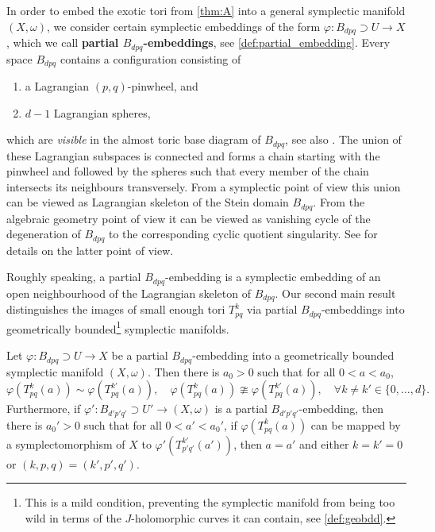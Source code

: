 \documentclass[12pt,a4paper,abstract=true,draft]{scrartcl}
\begin{document}
In order to embed the exotic tori from \cref{thm:A} into a general symplectic manifold $(X,\omega)$, we consider certain symplectic embeddings of the form $\varphi \colon B_{dpq} \supset U \rightarrow X$, which we call \textbf{partial $B_{dpq}$-embeddings}, see \cref{def:partial_embedding}. Every space $B_{dpq}$ contains a configuration consisting of 
\begin{enumerate}
    \item a Lagrangian $(p,q)$-pinwheel, and
    \item $d-1$ Lagrangian spheres,
\end{enumerate}
which are \emph{visible} in the almost toric base diagram of $B_{dpq}$, see also \cite[Chapter 5]{evans2021atfs}.
The union of these Lagrangian subspaces is connected and forms a chain starting with the pinwheel and followed by the spheres such that every member of the chain intersects its neighbours transversely.
From a symplectic point of view this union can be viewed as Lagrangian skeleton of the Stein domain $B_{dpq}$.
From the algebraic geometry point of view it can be viewed as vanishing cycle of the degeneration of $B_{dpq}$ to the corresponding cyclic quotient singularity.
See \cite{Eva19} for details on the latter point of view.

Roughly speaking, a partial $B_{dpq}$-embedding is a symplectic embedding of an open neighbourhood of the Lagrangian skeleton of $B_{dpq}$.
Our second main result distinguishes the images of small enough tori $T^k_{pq}$ via partial $B_{dpq}$-embeddings into geometrically bounded\footnote{This is a mild condition, preventing the symplectic manifold from being too wild in terms of the $J$-holomorphic curves it can contain, see \cref{def:geobdd}.} symplectic manifolds. 

\begin{maintheorem}
    \label{thm:B}
    Let $\varphi \colon B_{dpq} \supset U \rightarrow X$ be a partial $B_{dpq}$-embedding into a geometrically bounded symplectic manifold $(X,\omega)$.
Then there is $a_0 > 0$ such that for all $0 < a < a_0$, 
    \begin{equation}
        \varphi(T^k_{pq}(a)) \sim \varphi(T^{k'}_{pq}(a)), \quad 
        \varphi(T^k_{pq}(a)) \ncong \varphi(T^{k'}_{pq}(a)), \quad
        \forall k \neq k' \in \{0,\ldots,d\}.
    \end{equation}
    Furthermore, if $\varphi' \colon B_{d'p'q'} \supset U' \rightarrow (X,\omega)$ is a partial $B_{d'p'q'}$-embedding, then there is $a_0' > 0$ such that for all $0<a' < a_0'$, if $\varphi(T^k_{pq}(a))$ can be mapped by a symplectomorphism of $X$ to $\varphi'(T^{k'}_{p'q'}(a'))$, then $a=a'$ and either $k = k' = 0$ or $(k,p,q) = (k',p',q')$. 
\end{maintheorem}
\end{document}
